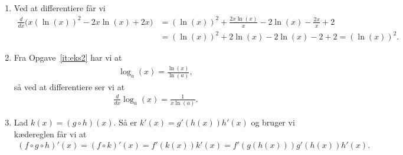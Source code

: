 \begin{enumerate}
	
	\item\label{it:diff32ans} Ved at differentiere får vi
	\begin{align*}
	\frac{d}{dx}\Big( x(\ln(x))^2 -2x\ln(x)+2x\Big)	&=(\ln(x))^2+\frac{2x\ln(x)}{x}-2\ln(x)-\frac{2x}{x}+2\\
	&=(\ln(x))^2+2\ln(x)-2\ln(x)-2+2=(\ln(x))^2.
	\end{align*}
	
	
	
	\item Fra Opgave~\ref{it:eks2} har vi at
	\begin{align*}
	\log_a(x)=\frac{\ln(x)}{\ln(a)},
	\end{align*}
	så ved at differentiere ser vi at
	\begin{align*}
	\frac{d}{dx} \log_a(x)=\frac{1}{x\ln(a)}.
	\end{align*}
	
	\item Lad $k(x)=(g\circ h)(x)$. Så er $k'(x)=g'(h(x))h'(x)$ og bruger vi kædereglen får vi at
	\begin{align*}
	(f\circ g \circ h)'(x)=(f\circ k)'(x)=f'(k(x))k'(x)=f'(g(h(x)))g'(h(x))h'(x).
	\end{align*}
\end{enumerate}